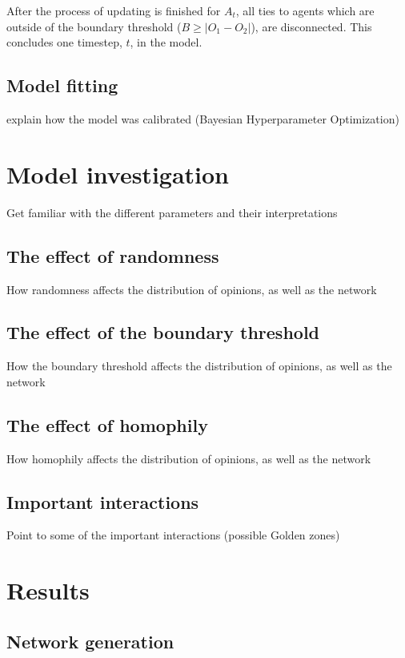 \documentclass[9pt,twocolumn,twoside]{ilcss}
\begin{document}
After the process of updating is finished for $A_t$, all ties to agents which are outside of the boundary threshold ($B \geq |O_1 - O_2|$), are disconnected. 
This concludes one timestep, $t$, in the model. 
\subsection{Model fitting}

explain how the model was calibrated (Bayesian Hyperparameter Optimization)

\section{Model investigation}

Get familiar with the different parameters and their interpretations

\subsection{The effect of randomness}

How randomness affects the distribution of opinions, as well as the network

\subsection{The effect of the boundary threshold}

How the boundary threshold affects the distribution of opinions, as well as the network

\subsection{The effect of homophily}

How homophily affects the distribution of opinions, as well as the network

\subsection{Important interactions}

Point to some of the important interactions (possible Golden zones)

\section{Results}

\subsection{Network generation}
\end{document}
